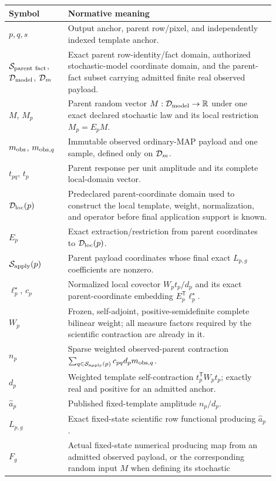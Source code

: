 \begin{longtable}{p{0.20\linewidth}p{0.70\linewidth}}
\toprule
Symbol & Normative meaning \\
\midrule
\endhead
$p,q,s$ & Output anchor, parent row/pixel, and independently indexed template
anchor. \\
$\mathcal{S}_{\rm parent\ fact}$, $\mathcal{D}_{\rm model}$, $\mathcal{D}_m$ & Exact parent
row-identity/fact domain, authorized stochastic-model coordinate domain, and
the parent-fact subset carrying admitted finite real observed payload. \\
$M$, $M_p$ & Parent random vector $M:\mathcal{D}_{\rm model}\to\mathbb{R}$ under one exact
declared stochastic law and its local restriction $M_p=E_pM$. \\
$m_{\rm obs}$, $m_{{\rm obs},q}$ & Immutable observed ordinary-MAP payload and
one sample, defined only on $\mathcal{D}_m$. \\
$t_{pq}$, $t_p$ & Parent response per unit amplitude and its complete
local-domain vector. \\
$\mathcal{D}_{\rm loc}(p)$ & Predeclared parent-coordinate domain used to construct the
local template, weight, normalization, and operator before final application
support is known. \\
$E_p$ & Exact extraction/restriction from parent coordinates to
$\mathcal{D}_{\rm loc}(p)$. \\
$\mathcal{S}_{\rm apply}(p)$ & Parent payload coordinates whose final exact
$L_{p,g}$ coefficients are nonzero. \\
$\ell_p^\star$, $c_p$ & Normalized local covector $W_pt_p/d_p$ and its exact
parent-coordinate embedding $E_p^{\mathsf T}\ell_p^\star$. \\
$W_p$ & Frozen, self-adjoint, positive-semidefinite complete bilinear weight;
all measure factors required by the scientific contraction are already in it. \\
$n_p$ & Sparse weighted observed-parent contraction
$\sum_{q\in\mathcal{S}_{\rm apply}(p)}c_{pq}d_pm_{{\rm obs},q}$. \\
$d_p$ & Weighted template self-contraction $t_p^{\mathsf T}W_pt_p$; exactly
real and positive for an admitted anchor. \\
$\widehat a_p$ & Published fixed-template amplitude $n_p/d_p$. \\
$L_{p,g}$ & Exact fixed-state scientific row functional producing
$\widehat a_p$. \\
$F_g$ & Actual fixed-state numerical producing map from an admitted observed
payload, or the corresponding random input $M$ when defining its stochastic

\end{longtable}
